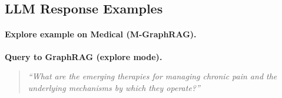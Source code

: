 




\subsection{LLM Response Examples}
\label{app:examples}

\paragraph{Explore example on Medical (M-GraphRAG).}
\label{app:explore_example}
\noindent\textbf{Query to GraphRAG (explore mode).}
\begin{quote}
\textit{``What are the emerging therapies for managing chronic pain and the underlying mechanisms by which they operate?''}
\end{quote}

